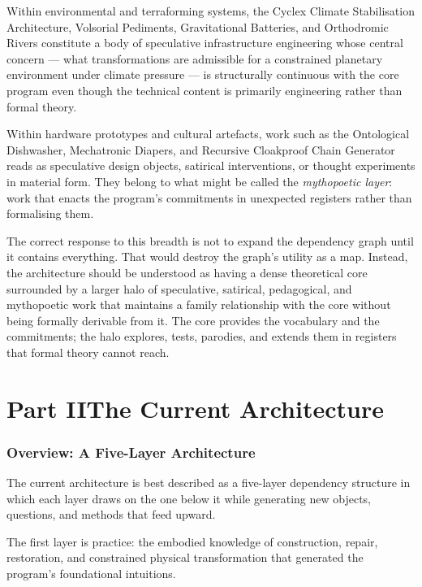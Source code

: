 \documentclass[12pt, twoside]{article}
\begin{document}
Within environmental and terraforming systems, the Cyclex Climate
Stabilisation Architecture, Volsorial Pediments, Gravitational Batteries, and
Orthodromic Rivers constitute a body of speculative infrastructure engineering
whose central concern — what transformations are admissible for a
constrained planetary environment under climate pressure — is structurally
continuous with the core program even though the technical content is
primarily engineering rather than formal theory.

Within hardware prototypes and cultural artefacts, work such as the
Ontological Dishwasher, Mechatronic Diapers, and Recursive Cloakproof Chain
Generator reads as speculative design objects, satirical interventions, or
thought experiments in material form. They belong to what might be called the
\emph{mythopoetic layer}: work that enacts the program's commitments in
unexpected registers rather than formalising them.

The correct response to this breadth is not to expand the dependency graph
until it contains everything. That would destroy the graph's utility as a
map. Instead, the architecture should be understood as having a dense
theoretical core surrounded by a larger halo of speculative, satirical,
pedagogical, and mythopoetic work that maintains a family relationship with
the core without being formally derivable from it. The core provides the
vocabulary and the commitments; the halo explores, tests, parodies, and
extends them in registers that formal theory cannot reach.

\part*{Part II\quad The Current Architecture}

\section{Overview: A Five-Layer Architecture}

The current architecture is best described as a five-layer dependency
structure in which each layer draws on the one below it while generating
new objects, questions, and methods that feed upward.

The first layer is practice: the embodied knowledge of construction, repair,
restoration, and constrained physical transformation that generated the
program's foundational intuitions.
\end{document}
